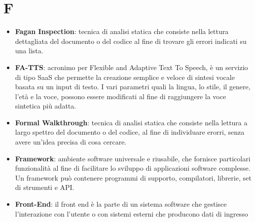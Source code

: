 \section{F}
\begin{itemize} 
	\item \textbf{Fagan Inspection}: tecnica di analisi statica che consiste nella lettura dettagliata del documento o del codice al fine di trovare gli errori indicati su una lista.
	\item \textbf{FA-TTS}: acronimo per Flexible and Adaptive Text To Speech, è un servizio di tipo SaaS che permette la creazione semplice e veloce di sintesi vocale basata su un input di testo. I vari parametri quali la lingua, lo stile, il genere, l'età e la voce, possono essere modificati al fine di raggiungere la voce sintetica più adatta.
	\item \textbf{Formal Walkthrough}: tecnica di analisi statica che consiste nella lettura a largo spettro del documento o del codice, al fine di individuare erorri, senza avere un'idea precisa di cosa cercare.
	\item \textbf{Framework}: ambiente software universale e riusabile, che fornisce particolari funzionalità al fine di facilitare lo sviluppo di applicazioni software complesse. Un framework può contenere programmi di supporto, compilatori, librerie, set di strumenti e API.
 	\item \textbf{Front-End}:  il front end è la parte di un sistema software che gestisce l'interazione con l'utente o con sistemi esterni che producono dati di ingresso 
\end{itemize}